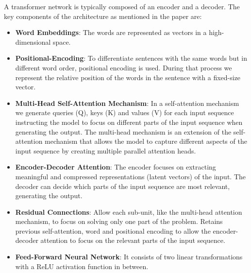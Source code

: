 \documentclass[lettersize,journal]{IEEEtran}
\begin{document}
\smallskip

A transformer network is typically composed of an encoder and a decoder. The key components
of the architecture as mentioned in the paper are:
\begin{itemize}
    \item \textbf{Word Embeddings}: The words are represented as vectors in a high-dimensional space.

    \item \textbf{Positional-Encoding}: To differentiate sentences with the same words but in different
    word order, positional encoding is used. During that process we represent the relative position of 
    the words in the sentence with a fixed-size vector. 

    \item \textbf{Multi-Head Self-Attention Mechanism}: In a self-attention mechanism we generate 
    queries (Q), keys (K) and values (V) for each input sequence instructing the model to focus on
    different parts of the input sequence when generating the output. The multi-head mechanism is an
    extension of the self-attention mechanism that allows the model to capture different aspects of the
    input sequence by creating multiple parallel attention heads.

    \item \textbf{Encoder-Decoder Attention}: The encoder focuses on extracting meaningful 
    and compressed representations (latent vectors) of the input. The decoder can decide which 
    parts of the input sequence are most relevant, generating the output. 

    \item \textbf{Residual Connections}: Allow each sub-unit, like the multi-head attention mechanism,
    to focus on solving only one part of the problem. Retains previous self-attention, word and positional
    encoding to allow the encoder-decoder attention to focus on the relevant parts of the input sequence.

    \item \textbf{Feed-Forward Neural Network}: It consists of two linear transformations with a ReLU 
    activation function in between.
\end{itemize}

\end{document}
